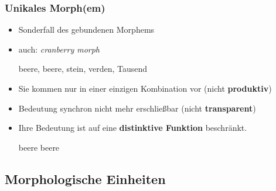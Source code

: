 \begin{frame}
\frametitle{Unikales Morph(em)}

\begin{itemize}
	\item Sonderfall des gebundenen Morphems
	
	\item auch: \emph{cranberry morph}
	
	
	\ea {}beere, beere, stein, verden, Tausend
	\z


	\item Sie kommen nur in einer einzigen Kombination vor (nicht \textbf{produktiv})

	\item Bedeutung synchron nicht mehr erschließbar (nicht \textbf{transparent})

	\item Ihre Bedeutung ist auf eine \textbf{distinktive Funktion} beschränkt.
	
	\ea {}beere \vs {}beere
	\z 

\end{itemize}

\end{frame}


\subsection{Morphologische Einheiten}
\frame{
\frametitle{~}
	\tableofcontents[currentsection]
}

